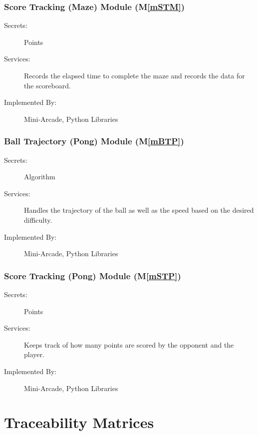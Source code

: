 \documentclass[12pt, titlepage]{article}
\newcommand{\mref}[1]{M\ref{#1}}
\begin{document}
\subsubsection{Score Tracking (Maze) Module (\mref{mSTM})}
\begin{description}
\item[Secrets:] Points
\item[Services:] Records the elapsed time to complete the maze and records the data for the scoreboard.
\item[Implemented By:] Mini-Arcade, Python Libraries
\end{description}

\subsubsection{Ball Trajectory (Pong) Module (\mref{mBTP})}
\begin{description}
\item[Secrets:] Algorithm
\item[Services:] Handles the trajectory of the ball as well as the speed based on the desired difficulty.
\item[Implemented By:] Mini-Arcade, Python Libraries
\end{description}

\subsubsection{Score Tracking (Pong) Module (\mref{mSTP})}
\begin{description}
\item[Secrets:] Points
\item[Services:] Keeps track of how many points are scored by the opponent and the player.
\item[Implemented By:] Mini-Arcade, Python Libraries
\end{description}

\newpage
\section{Traceability Matrices} \label{SecTM}
\end{document}
